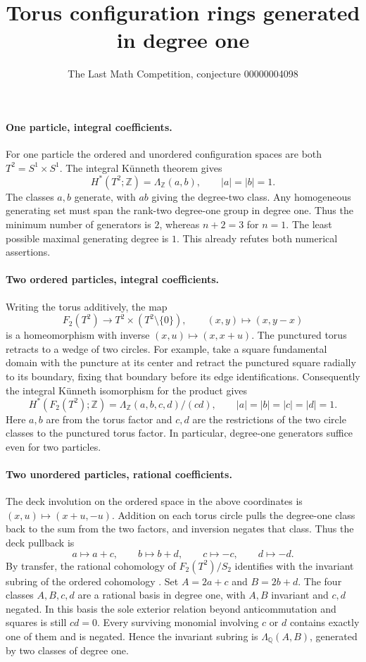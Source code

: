 \documentclass[11pt]{article}
\title{Torus configuration rings generated in degree one}
\author{The Last Math Competition, conjecture 00000004098}
\date{}
\begin{document}
\maketitle

\paragraph{One particle, integral coefficients.}
For one particle the ordered and unordered configuration spaces are
both \(T^2=S^1\times S^1\). The integral Künneth theorem gives
\[
  H^*(T^2;\mathbb Z)=\Lambda_{\mathbb Z}(a,b), \qquad |a|=|b|=1.
\]
The classes \(a,b\) generate, with \(ab\) giving the degree-two
class. Any homogeneous generating set must span the rank-two
degree-one group in degree one. Thus the minimum number of
generators is \(2\), whereas \(n+2=3\) for \(n=1\). The least
possible maximal generating degree is \(1\). This already refutes
both numerical assertions.

\paragraph{Two ordered particles, integral coefficients.}
Writing the torus additively, the map
\[
  F_2(T^2)\longrightarrow T^2\times(T^2\setminus\{0\}),\qquad
  (x,y)\longmapsto (x,y-x)
\]
is a homeomorphism with inverse \((x,u)\mapsto (x,x+u)\).
The punctured torus retracts to a wedge of two circles. For example,
take a square fundamental domain with the puncture at its center
and retract the punctured square radially to its boundary, fixing that
boundary before its edge identifications.
Consequently the integral Künneth isomorphism for the product gives
\[
  H^*(F_2(T^2);\mathbb Z)=
  \Lambda_{\mathbb Z}(a,b,c,d)/(cd),
  \qquad |a|=|b|=|c|=|d|=1.
\]
Here \(a,b\) are from the torus factor and \(c,d\) are the
restrictions of the two circle classes to the punctured torus factor.
In particular, degree-one generators suffice even for two particles.

\paragraph{Two unordered particles, rational coefficients.}
The deck involution on the ordered space in the above coordinates is
\((x,u)\mapsto(x+u,-u)\). Addition on each torus circle pulls the
degree-one class back to the sum from the two factors, and inversion
negates that class. Thus the deck pullback is
\[
  a\longmapsto a+c,\qquad b\longmapsto b+d,\qquad
  c\longmapsto-c,\qquad d\longmapsto-d .
\]
By transfer, the rational cohomology of \(F_2(T^2)/S_2\) identifies
with the invariant subring of the ordered cohomology
\cite[Proposition 3G.1]{hatcher}. Set \(A=2a+c\) and \(B=2b+d\).
The four classes \(A,B,c,d\) are a rational basis in degree one, with
\(A,B\) invariant and \(c,d\) negated. In this basis the sole exterior
relation beyond anticommutation and squares is still \(cd=0\).
Every surviving monomial involving \(c\) or \(d\) contains exactly
one of them and is negated. Hence the invariant subring is
\(\Lambda_{\mathbb Q}(A,B)\), generated by two classes of degree one.
\end{document}
